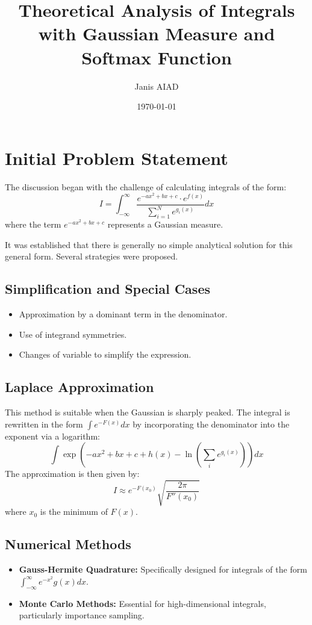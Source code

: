 \documentclass[12pt]{article}
\title{Theoretical Analysis of Integrals with Gaussian Measure and Softmax Function}
\author{Janis AIAD}
\date{\today}
\begin{document}
\maketitle

\section{Initial Problem Statement}

The discussion began with the challenge of calculating integrals of the form:
\[
I = \int_{-\infty}^{\infty} \frac{e^{-ax^2 + bx + c} \cdot e^{f(x)}}{\sum_{i=1}^{N} e^{g_i(x)}} dx
\]
where the term $e^{-ax^2+bx+c}$ represents a Gaussian measure.

It was established that there is generally no simple analytical solution for this general form. Several strategies were proposed.

\subsection{Simplification and Special Cases}
\begin{itemize}
    \item Approximation by a dominant term in the denominator.
    \item Use of integrand symmetries.
    \item Changes of variable to simplify the expression.
\end{itemize}

\subsection{Laplace Approximation}
This method is suitable when the Gaussian is sharply peaked. The integral is rewritten in the form $\int e^{-F(x)} dx$ by incorporating the denominator into the exponent via a logarithm:
\[
\int \exp\left(-ax^2 + bx + c + h(x) - \ln\left(\sum_i e^{g_i(x)}\right)\right) dx
\]
The approximation is then given by:
\[
I \approx e^{-F(x_0)} \sqrt{\frac{2\pi}{F''(x_0)}}
\]
where $x_0$ is the minimum of $F(x)$.

\subsection{Numerical Methods}
\begin{itemize}
    \item \textbf{Gauss-Hermite Quadrature:} Specifically designed for integrals of the form $\int_{-\infty}^{\infty} e^{-x^2} g(x) dx$.
    \item \textbf{Monte Carlo Methods:} Essential for high-dimensional integrals, particularly importance sampling.
\end{itemize}
\end{document}
